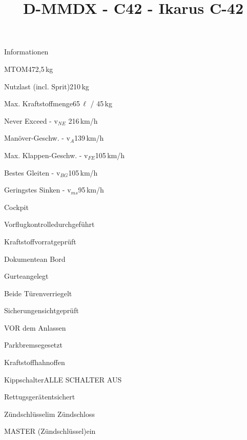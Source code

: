 \def\papersize{4}




\title{D-MMDX  -  C42  -  Ikarus C-42}

\begin{checklist}{Informationen}
 	\item{MTOM}{472,5\,kg}
  	\item{Nutzlast (incl. Sprit)}{210\,kg}
  	\item{Max. Kraftstoffmenge}{65\,${\ell}$ / 45\,kg}
 	  \item{Never Exceed  -  v$_{NE}$ }{216\,km/h}
	  \item{Manöver-Geschw.  -  v$_{A}$}{139\,km/h}
	  \item{Max. Klappen-Geschw.  -  v$_{FE}$}{105\,km/h}
	  \item{Bestes Gleiten  -  v$_{BG}$}{105\,km/h}
	  \item{Geringstes Sinken  -  v$_{ms}$}{95\,km/h}
\end{checklist}

\begin{checklist}{Cockpit}
	\item{Vorflugkontrolle}{durchgeführt}
	\item{Kraftstoffvorrat}{geprüft}
	\item{Dokumente}{an Bord}
	\item{Gurte}{angelegt}
	\item{Beide Türen}{verriegelt}
	\item{Sicherungen}{sichtgeprüft}
\end{checklist}

\begin{checklist}{VOR dem Anlassen}
	\item{Parkbremse}{gesetzt}
	\item{Kraftstoffhahn}{offen}
	\item{Kippschalter}{ALLE SCHALTER AUS}
	\item{Rettugsgerät}{entsichert}
	\item{Zündschlüssel}{im Zündschloss}
	\item{MASTER (Zündschlüssel)}{ein}
\end{checklist}

